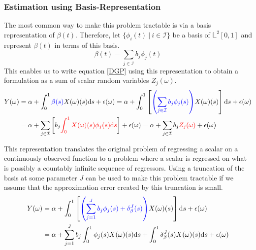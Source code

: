 \documentclass[11pt,twoside,a4paper]{article}
\begin{document}
	\subsubsection{Estimation using Basis-Representation}\label{basis_exp_transf}
	The most common way to make this problem tractable is via a basis representation of $\beta(t)$. Therefore, let $\{\phi_i(t) \: \vert \: i \in \mathcal{I}\}$ be a basis of $\mathbb{L}^2[0,1]$ and represent $\beta(t)$ in terms of this basis.
	\begin{equation}
		\beta(t) = \sum_{j \in \mathcal{I}} b_j \phi_j(t)
	\end{equation}
	This enables us to write equation \ref{DGP} using this representation to obtain a formulation as a sum of scalar random variables $Z_j(\omega)$.	
	\begin{equation}
		\begin{split}
			Y(\omega) & = \alpha + \int_{0}^{1} {\color{blue}\beta(s)} X(\omega)(s)\mathrm{d}s + \epsilon(\omega)
			= \alpha + \int_{0}^{1}\left[{\color{blue}\left(\sum_{j \in \mathcal{I}} b_j \phi_j(s)\right)} X(\omega)(s) \right]\mathrm{d}s + \epsilon(\omega) \\
			& = \alpha + \sum_{j \in \mathcal{I}} \left[b_j \textcolor{red}{\int_{0}^{1} X(\omega)(s) \phi_j(s)\mathrm{d}s}\right] + \epsilon(\omega)
		      = \alpha + \sum_{j \in \mathcal{I}} b_j \textcolor{red}{Z_j(\omega)} + \epsilon(\omega)
		\end{split}
	\end{equation}
	
	This representation translates the original problem of regressing a scalar on a continuously observed function to a problem where a scalar is regressed on what is possibly a countably infinite sequence of regressors. Using a truncation of the basis at some parameter $J$ can be used to make this problem tractable if we assume that the approximation error created by this truncation is small.
	\begin{equation}
		\begin{split}
			Y(\omega) & = \alpha + \int_{0}^{1}\left[{\color{blue}\left(\sum_{j = 1}^{J} b_j \phi_j(s) + \delta_{\beta}^{J}(s)\right)} X(\omega)(s) \right]\mathrm{d}s + \epsilon(\omega) \\
			& = \alpha + \sum_{j = 1}^{J} b_j \int_{0}^{1} \phi_j(s) X(\omega)(s) \mathrm{d}s +  \int_{0}^{1} \delta_{\beta}^{J}(s) X(\omega)(s) \mathrm{d}s + \epsilon(\omega)
		\end{split}
	\end{equation}
\end{document}
